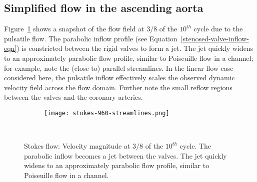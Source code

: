 \documentclass[3p]{elsarticle}
\begin{document}
\subsection{Simplified flow in the ascending aorta}
\label{stenosed-valve-results}
Figure~\ref{stenosed-valve-stokes-solution-fig} shows
a snapshot of the flow field at $3/8$ of the $10^{th}$ cycle due to the pulsatile flow.
The parabolic inflow profile (see Equation~\eqref{stenosed-valve-inflow-eqn})
is constricted between the rigid valves to form a jet.
The jet quickly widens to an approximately parabolic flow profile,
similar to Poiseuille flow in a channel; for example, note the (close to) parallel
streamlines. In the linear flow case considered here, the pulsatile inflow effectively scales
the observed dynamic velocity field across the flow domain.
Further note the small reflow regions between the valves and the coronary arteries.
\FloatBarrier
\begin{figure}[ht!]
    \centering
    \begin{subfigure}[b]{0.49\textwidth}
        \centering
        \texttt{[image: stokes-960-streamlines.png]}        \vspace{0.35cm}
    \end{subfigure}~~~~~~~~~~\begin{subfigure}[b]{0.15\textwidth}
                \centering
            \end{subfigure}
    \caption{Stokes flow:
        Velocity magnitude at $3/8$ of the $10^{th}$ cycle.
        The parabolic inflow becomes a jet between the valves.
        The jet quickly widens to an approximately parabolic flow profile,
        similar to Poiseuille flow in a channel.
        }
    \label{stenosed-valve-stokes-solution-fig}
\end{figure}
\FloatBarrier
\end{document}

